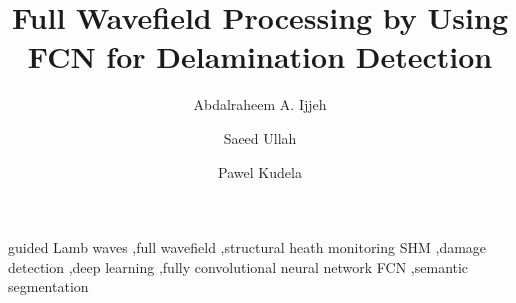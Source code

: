 \documentclass[preprint,9pt]{elsarticle}
\begin{document}
	\begin{frontmatter}
		
		\title{Full Wavefield Processing by Using FCN for Delamination Detection}
		
		\address[IFFM]{Institute of Fluid Flow Machinery, Polish Academy of Sciences, Poland}
		
		\author{Abdalraheem A. Ijjeh}
		\author{Saeed Ullah }
		\author{Pawel Kudela}
		
		
		\begin{abstract}
		
		\end{abstract}
		
		\begin{keyword}
			guided Lamb waves \sep full wavefield \sep structural heath monitoring SHM \sep damage detection \sep deep learning \sep fully convolutional neural network FCN \sep semantic segmentation 
			
			
		\end{keyword}
		
	\end{frontmatter}

\end{document}
